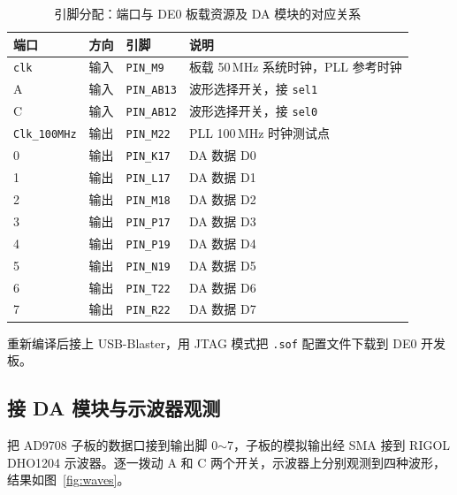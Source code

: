 \documentclass[12pt]{ctexart}
\begin{document}
\begin{table}[H]
    \centering
    \caption{引脚分配：端口与 DE0 板载资源及 DA 模块的对应关系}
    \label{tab:pins}
    \begin{tabular}{llll}
        \toprule
        \textbf{端口} & \textbf{方向} & \textbf{引脚} & \textbf{说明} \\
        \midrule
        \texttt{clk}         & 输入 & \texttt{PIN\_M9}   & 板载 50\,MHz 系统时钟，PLL 参考时钟 \\
        A                    & 输入 & \texttt{PIN\_AB13} & 波形选择开关，接 \texttt{sel1} \\
        C                    & 输入 & \texttt{PIN\_AB12} & 波形选择开关，接 \texttt{sel0} \\
        \texttt{Clk\_100MHz} & 输出 & \texttt{PIN\_M22}  & PLL 100\,MHz 时钟测试点 \\
        0                    & 输出 & \texttt{PIN\_K17}  & DA 数据 D0 \\
        1                    & 输出 & \texttt{PIN\_L17}  & DA 数据 D1 \\
        2                    & 输出 & \texttt{PIN\_M18}  & DA 数据 D2 \\
        3                    & 输出 & \texttt{PIN\_P17}  & DA 数据 D3 \\
        4                    & 输出 & \texttt{PIN\_P19}  & DA 数据 D4 \\
        5                    & 输出 & \texttt{PIN\_N19}  & DA 数据 D5 \\
        6                    & 输出 & \texttt{PIN\_T22}  & DA 数据 D6 \\
        7                    & 输出 & \texttt{PIN\_R22}  & DA 数据 D7 \\
        \bottomrule
    \end{tabular}
\end{table}

重新编译后接上 USB-Blaster，用 JTAG 模式把 \texttt{.sof} 配置文件下载到 DE0 开发板。

\subsection{接 DA 模块与示波器观测}

把 AD9708 子板的数据口接到输出脚 0$\sim$7，子板的模拟输出经 SMA 接到 RIGOL DHO1204 示波器。逐一拨动 A 和 C 两个开关，示波器上分别观测到四种波形，结果如图~\ref{fig:waves}。
\end{document}

